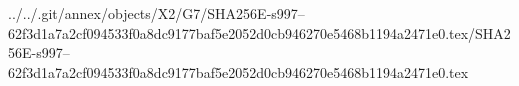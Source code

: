 ../../.git/annex/objects/X2/G7/SHA256E-s997--62f3d1a7a2cf094533f0a8dc9177baf5e2052d0cb946270e5468b1194a2471e0.tex/SHA256E-s997--62f3d1a7a2cf094533f0a8dc9177baf5e2052d0cb946270e5468b1194a2471e0.tex